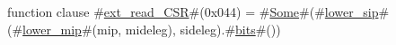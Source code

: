 function clause #\hyperref[sailRISCVzextzyreadzyCSR]{ext\_read\_CSR}#(0x044) = #\hyperref[sailRISCVzSome]{Some}#(#\hyperref[sailRISCVzlowerzysip]{lower\_sip}#(#\hyperref[sailRISCVzlowerzymip]{lower\_mip}#(mip, mideleg), sideleg).#\hyperref[sailRISCVzbits]{bits}#())
